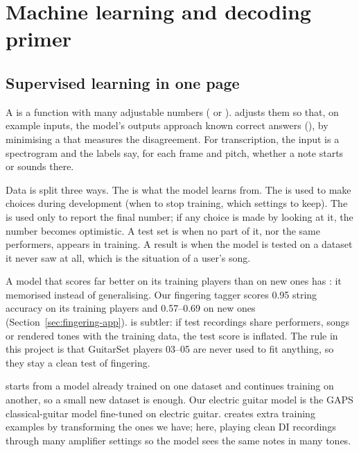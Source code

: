 \section{Machine learning and decoding primer}
\label{sec:learning}

\subsection{Supervised learning in one page}

A  is a function with many adjustable numbers ( or
).  adjusts them so that, on example inputs, the
model's outputs approach known correct answers (), by minimising a
 that measures the disagreement. For transcription, the input is a
spectrogram and the labels say, for each frame and pitch, whether a note starts
or sounds there.

Data is split three ways. The  is what the model learns
from. The  is used to make choices during development
(when to stop training, which settings to keep). The  is used
only to report the final number; if any choice is made by looking at it, the
number becomes optimistic. A test set is  when no part of it, nor
the same performers, appears in training. A result is  when the
model is tested on a dataset it never saw at all, which is the situation of a
user's song.

\begin{caution}
A model that scores far better on its training players than on new ones has
: it memorised instead of generalising. Our fingering tagger
scores 0.95 string accuracy on its training players and 0.57--0.69 on new
ones (Section~\ref{sec:fingering-app}).  is subtler: if test
recordings share performers, songs or rendered tones with the training data,
the test score is inflated. The rule in this project is that GuitarSet players
03--05 are never used to fit anything, so they stay a clean test of fingering.
\end{caution}

 starts from a model already trained on one dataset and
continues training on another, so a small new dataset is enough. Our electric
guitar model is the GAPS classical-guitar model fine-tuned on electric guitar.
 creates extra training examples by transforming the
ones we have; here, playing clean DI recordings through many amplifier
settings so the model sees the same notes in many tones.

